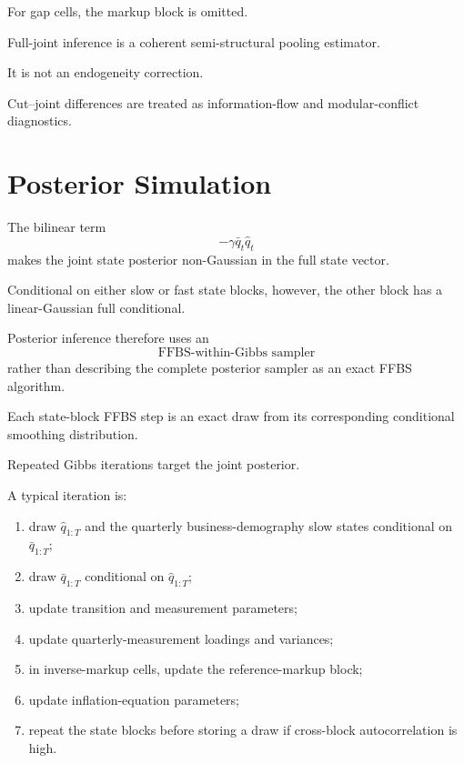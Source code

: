 \documentclass[11pt]{article}
\begin{document}
For gap cells, the markup block is omitted.

Full-joint inference is a coherent semi-structural pooling estimator.

It is not an endogeneity correction.

Cut--joint differences are treated as information-flow and modular-conflict diagnostics.

\section{Posterior Simulation}

The bilinear term
\begin{equation}
-\gamma\bar q_t\hat q_t
\end{equation}
makes the joint state posterior non-Gaussian in the full state vector.

Conditional on either slow or fast state blocks, however, the other block has a linear-Gaussian full conditional.

Posterior inference therefore uses an
\begin{equation}
\boxed{\text{FFBS-within-Gibbs sampler}}
\end{equation}
rather than describing the complete posterior sampler as an exact FFBS algorithm.

Each state-block FFBS step is an exact draw from its corresponding conditional smoothing distribution.

Repeated Gibbs iterations target the joint posterior.

A typical iteration is:
\begin{enumerate}
\item draw \(\hat q_{1:T}\) and the quarterly business-demography slow states conditional on \(\bar q_{1:T}\);
\item draw \(\bar q_{1:T}\) conditional on \(\hat q_{1:T}\);
\item update transition and measurement parameters;
\item update quarterly-measurement loadings and variances;
\item in inverse-markup cells, update the reference-markup block;
\item update inflation-equation parameters;
\item repeat the state blocks before storing a draw if cross-block autocorrelation is high.
\end{enumerate}
\end{document}
